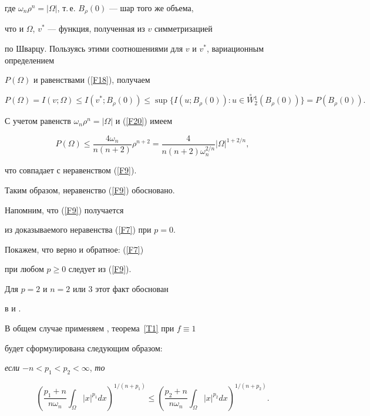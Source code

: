 где $\omega_n\rho^n=|\Omega|$, т.\,е. $B_\rho (0)$ --- шар того же объема, 


что и $\Omega$, $v^*$ --- функция, полученная из $v$ симметризацией


по Шварцу. Пользуясь этими соотношениями для $v$ и $v^*$, вариационным определением


$P(\Omega)$ и равенствами (\ref{F18}), получаем


$$


P(\Omega)=I(v;\Omega) \leq I(v^*;B_\rho (0))\leq


\sup \{ I(u;B_\rho (0)) : u\in \overset{\circ}{W}{}_2^1(B_\rho (0)) \}


= P(B_\rho (0)).


$$


С учетом равенств $\omega_n\rho^n=|\Omega|$ и (\ref{F20}) имеем


$$


P(\Omega)\leq \frac{4\omega_n}{n(n+2)}\rho^{n+2}


=\frac{4}{n(n+2)\omega_n^{2/n}}|\Omega|^{1+2/n},


$$


что совпадает с неравенством (\ref{F9}).





Таким образом, неравенство (\ref{F9}) обосновано. 


Напомним, что (\ref{F9}) получается


из доказываемого неравенства (\ref{F7}) при $p=0$. 


Покажем, что верно и обратное: (\ref{F7})


при любом $p\geq 0$ следует из (\ref{F9}).


Для $p=2$ и $n=2$ или $3$ этот факт обоснован


в \cite{l1}  и \cite{l2}.


В общем случае применяем \cite{l15}, теорема~\ref{T1} при $f\equiv 1$


будет сформулирована следующим образом:





{\it если} $-n<p_1<p_2<\infty$,  {\it то}


\begin{equation} \label{F21}


\left( {\frac{p_1+n}{n\omega_n}


\int_\Omega |x|^{p_1}dx} \right)^{1/(n+p_1)} \leq


\left( {\frac{p_2+n}{n\omega_n}\int_\Omega |x|^{p_2}dx} \right)^{1/(n+p_2)}.


\end{equation}


